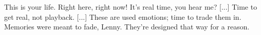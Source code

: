 \documentclass[12pt]{article}
\begin{document}
	\begin{displayquote}
		This is your life. Right here, right now! It’s real time, you hear me? [...] Time to get real, not playback. [...] These are used emotions; time to trade them in. Memories were meant to fade, Lenny. They’re designed that way for a reason.
	\end{displayquote}
	
	\printbibliography
\end{document}
